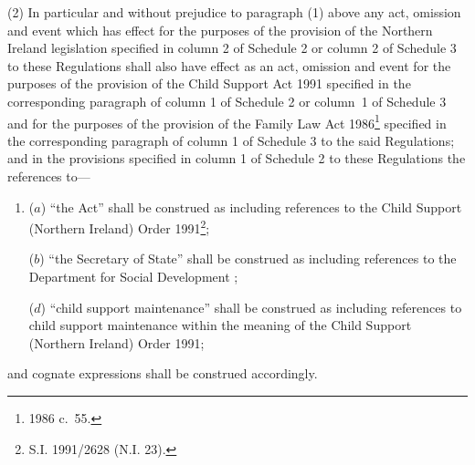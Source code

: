 \documentclass[12pt,a4paper]{article}
\begin{document}
(2) In particular and without prejudice to paragraph (1) above any act, omission and event which has effect for the purposes of the provision of the Northern Ireland legislation specified in column 2 of Schedule 2 
or column 2 of Schedule 3  %
to these Regulations shall also have effect as an act, omission and event for the purposes of the provision of the Child Support Act 1991 specified in the corresponding paragraph of column 1 of Schedule 2 
or column~1 of Schedule 3 and for the purposes of the provision of the Family Law Act 1986\footnote{1986 c.\ 55.} specified in the corresponding paragraph of column 1 of Schedule 3  %
to the said Regulations; and in the provisions specified in column 1 of Schedule 2 to these Regulations the references to—
\begin{enumerate}\item[]
($a$) “the Act” shall be construed as including references to the Child Support (Northern Ireland) Order 1991\footnote{\frenchspacing S.I. 1991/2628 (N.I. 23).};

($b$) “the Secretary of State” shall be construed as including references to the Department 
for Social Development%
;


($d$) “child support maintenance” shall be construed as including references to child support maintenance within the meaning of the Child Support (Northern Ireland) Order 1991;
\end{enumerate}
and cognate expressions shall be construed accordingly.

\end{document}
